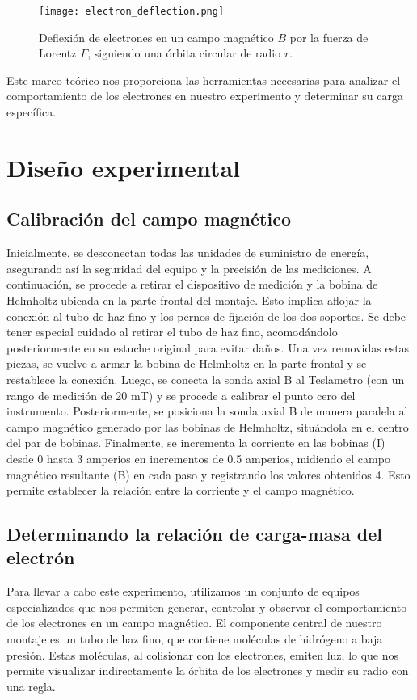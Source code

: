 \documentclass[twocolumn,a4paper,11pt]{scrartcl}
\begin{document}
\begin{figure}[h]
    \centering
    \texttt{[image: electron\_deflection.png]}
    \caption{Deflexión de electrones en un campo magnético $B$ por la fuerza de Lorentz $F$, siguiendo una órbita circular de radio $r$.}
    \label{fig:electron_deflection}
\end{figure}

Este marco teórico nos proporciona las herramientas necesarias para analizar el comportamiento de los electrones en nuestro experimento y determinar su carga específica.

\section{Diseño experimental}

\subsection*{Calibración del campo magnético}
Inicialmente, se desconectan todas las unidades de suministro de energía, asegurando así la seguridad del equipo y la precisión de las mediciones. A continuación, se procede a retirar el dispositivo de medición y la bobina de Helmholtz ubicada en la parte frontal del montaje. Esto implica aflojar la conexión al tubo de haz fino y los pernos de fijación de los dos soportes. Se debe tener especial cuidado al retirar el tubo de haz fino, acomodándolo posteriormente en su estuche original para evitar daños. Una vez removidas estas piezas, se vuelve a armar la bobina de Helmholtz en la parte frontal y se restablece la conexión. 
Luego, se conecta la sonda axial B al Teslametro (con un rango de medición de 20 mT) y se procede a calibrar el punto cero del instrumento. Posteriormente, se posiciona la sonda axial B de manera paralela al campo magnético generado por las bobinas de Helmholtz, situándola en el centro del par de bobinas. Finalmente, se incrementa la corriente en las bobinas (I) desde 0 hasta 3 amperios en incrementos de 0.5 amperios, midiendo el campo magnético resultante (B) en cada paso y registrando los valores obtenidos 4. Esto permite establecer la relación entre la corriente y el campo magnético.


\subsection*{Determinando la relación de carga-masa del electrón}
Para llevar a cabo este experimento, utilizamos un conjunto de equipos especializados que nos permiten generar, controlar y observar el comportamiento de los electrones en un campo magnético. El componente central de nuestro montaje es un tubo de haz fino, que contiene moléculas de hidrógeno a baja presión. Estas moléculas, al colisionar con los electrones, emiten luz, lo que nos permite visualizar indirectamente la órbita de los electrones y medir su radio con una regla.
\end{document}
